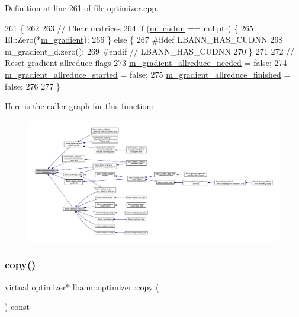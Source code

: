 Definition at line 261 of file optimizer.\+cpp.


\begin{DoxyCode}
261                                \{
262 
263   \textcolor{comment}{// Clear matrices}
264   \textcolor{keywordflow}{if} (\hyperlink{classlbann_1_1optimizer_a2f24dbeaca18b06f4aa7d179bbf96680}{m\_cudnn} == \textcolor{keyword}{nullptr}) \{
265     El::Zero(*\hyperlink{classlbann_1_1optimizer_a3df20cb0ae2b60430ad4fd235d66c12e}{m\_gradient});
266   \} \textcolor{keywordflow}{else} \{
267 \textcolor{preprocessor}{    #ifdef LBANN\_HAS\_CUDNN}
268     m\_gradient\_d.zero();
269 \textcolor{preprocessor}{    #endif // LBANN\_HAS\_CUDNN}
270   \}
271 
272   \textcolor{comment}{// Reset gradient allreduce flags}
273   \hyperlink{classlbann_1_1optimizer_a2dc18dcc3cf9510947304c3c5d059eb0}{m\_gradient\_allreduce\_needed} = \textcolor{keyword}{false};
274   \hyperlink{classlbann_1_1optimizer_ac77740a916f397600efae0c03bc5a045}{m\_gradient\_allreduce\_started} = \textcolor{keyword}{false};
275   \hyperlink{classlbann_1_1optimizer_a4d332551d05e245ad3f862653b5af65a}{m\_gradient\_allreduce\_finished} = \textcolor{keyword}{false};
276 
277 \}
\end{DoxyCode}
Here is the caller graph for this function\+:\nopagebreak
\begin{figure}[H]
\begin{center}
\leavevmode
\includegraphics[width=350pt]{classlbann_1_1optimizer_a3f41360479fbd46c704342bb4ef36d09_icgraph}
\end{center}
\end{figure}
\mbox{\label{classlbann_1_1optimizer_adf19a1d19d832ebfe70072cc202cdf39}} 
\subsubsection{\texorpdfstring{copy()}{copy()}}
{\footnotesize\ttfamily virtual \hyperlink{classlbann_1_1optimizer}{optimizer}$\ast$ lbann\+::optimizer\+::copy (\begin{DoxyParamCaption}{ }\end{DoxyParamCaption}) const\hspace{0.3cm}{\ttfamily [pure virtual]}}



